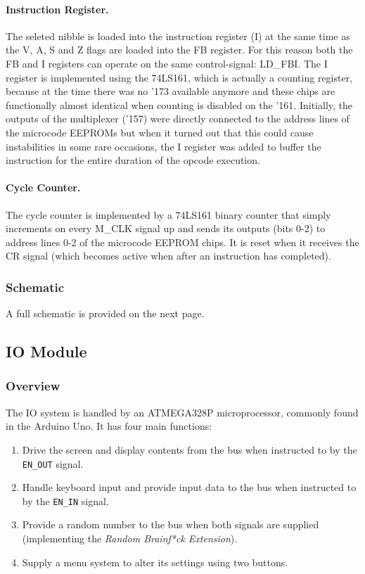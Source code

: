 \paragraph{Instruction Register.} The seleted nibble is loaded into the instruction register (I) at the same time as the V, A, S and Z flags are loaded into the FB register. For this reason both the FB and I registers can operate on the same control-signal: LD\_FBI. The I register is implemented using the 74LS161, which is actually a counting register, because at the time there was no '173 available anymore and these chips are functionally almost identical when counting is disabled on the '161. Initially, the outputs of the multiplexer ('157) were directly connected to the address lines of the microcode EEPROMs but when it turned out that this could cause instabilities in some rare occasions, the I register was added to buffer the instruction for the entire duration of the opcode execution.
 
\paragraph{Cycle Counter.} The cycle counter is implemented by a 74LS161 binary counter that simply increments on every M\_CLK signal up and sends its outputs (bits 0-2) to address lines 0-2 of the microcode EEPROM chips. It is reset when it receives the CR signal (which becomes active when after an instruction has completed).


\subsubsection{Schematic}
A full schematic is provided on the next page.


\subsection{IO Module}
\subsubsection{Overview}
The IO system is handled by an ATMEGA328P microprocessor, commonly found in the Arduino Uno. It has four main functions:
\begin{enumerate}
\item Drive the screen and display contents from the bus when instructed to by the \texttt{EN\_OUT} signal.
\item Handle keyboard input and provide input data to the bus when instructed to by the \texttt{EN\_IN} signal.
\item Provide a random number to the bus when both signals are supplied (implementing the \emph{Random Brainf*ck Extension}).
\item Supply a menu system to alter its settings using two buttons.
\end{enumerate}

